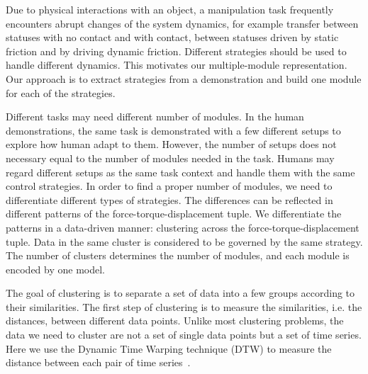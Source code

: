Due to physical interactions with an object, a manipulation task
frequently encounters abrupt changes of the system dynamics, for
example transfer between statuses with no contact and with contact,
between statuses driven by static friction and by driving %
dynamic friction. Different strategies should be used to handle
different dynamics.  This motivates our multiple-module
representation. Our approach is to extract strategies from a
demonstration and build one module for each of the
strategies. %


Different tasks may need different number of modules. In the human
demonstrations, the same task is demonstrated with a few different
setups to explore how human adapt to them. However, the number of
setups does not necessary equal to the number of modules needed in the
task. Humans may regard different setups as the same task context and
handle them with the same control
strategies. %
In order to find a proper number of modules, we need to differentiate
different types of strategies. The differences can be reflected in
different patterns of the force-torque-displacement tuple. We
differentiate the patterns in a data-driven manner: clustering across
the force-torque-displacement tuple. Data in the same cluster is
considered to be governed by the same strategy. The number of clusters
determines the number of modules, and each module is encoded by one model.


The goal of clustering is to separate a set of data into a few groups
according to their similarities. The first step of clustering is to
measure the similarities, i.e. the distances, between different data
points. Unlike most clustering problems, the data we need to cluster
are not a set of single data points but a set of time series. Here we
use the Dynamic Time Warping technique (DTW) to measure the distance
between each pair of time series~\citep{berndt1994using}.

